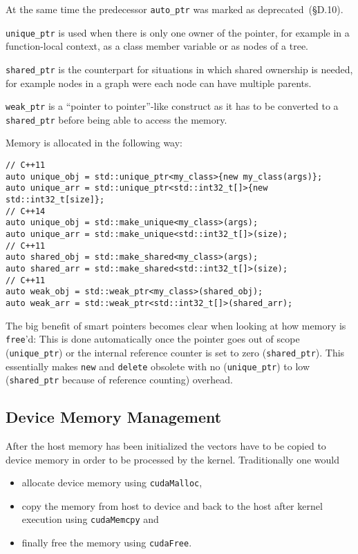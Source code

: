 At the same time the predecessor \texttt{auto\_ptr} was marked as deprecated~\cite{cpp11std}(§D.10).

\texttt{unique\_ptr} is used when there is only one owner of the pointer, for example in a function-local context, as a class member variable or as nodes of a tree.

\texttt{shared\_ptr} is the counterpart for situations in which shared ownership is needed, for example nodes in a graph were each node can have multiple parents.

\texttt{weak\_ptr} is a ``pointer to pointer''-like construct as it has to be converted to a \texttt{shared\_ptr} before being able to access the memory.

Memory is allocated in the following way:
\begin{lstlisting}
// C++11
auto unique_obj = std::unique_ptr<my_class>{new my_class(args)};
auto unique_arr = std::unique_ptr<std::int32_t[]>{new std::int32_t[size]};
// C++14
auto unique_obj = std::make_unique<my_class>(args);
auto unique_arr = std::make_unique<std::int32_t[]>(size);
// C++11
auto shared_obj = std::make_shared<my_class>(args);
auto shared_arr = std::make_shared<std::int32_t[]>(size);
// C++11
auto weak_obj = std::weak_ptr<my_class>(shared_obj);
auto weak_arr = std::weak_ptr<std::int32_t[]>(shared_arr);
\end{lstlisting}

The big benefit of smart pointers becomes clear when looking at how memory is \texttt{free}'d: This is done automatically once the pointer goes out of scope (\texttt{unique\_ptr}) or the internal reference counter is set to zero (\texttt{shared\_ptr}). This essentially makes \texttt{new} and \texttt{delete} obsolete with no (\texttt{unique\_ptr}) to low (\texttt{shared\_ptr} because of reference counting) overhead.

\subsection{Device Memory Management}

After the host memory has been initialized the vectors have to be copied to device memory in order to be processed by the kernel. Traditionally one would

\begin{itemize}
\item allocate device memory using \texttt{cudaMalloc},
\item copy the memory from host to device and back to the host after kernel execution using \texttt{cudaMemcpy} and
\item finally free the memory using \texttt{cudaFree}.
\end{itemize}


